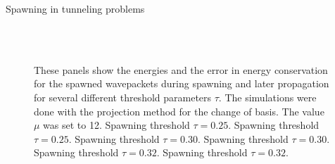 \begin{chapter}{Spawning in tunneling problems}
\begin{figure}[h!]
{  } \\
   \\
  \caption[Energies and energy drift of the spawned wavepackets during spawning and later propagation]{
  These panels show the energies and the error in energy conservation for the spawned wavepackets
  during spawning and later propagation for several different threshold parameters $\tau$.
  The simulations were done with the projection method for the change of basis. The value $\mu$ was set to 12.
   Spawning threshold $\tau = 0.25$.
   Spawning threshold $\tau = 0.25$.
   Spawning threshold $\tau = 0.30$.
   Spawning threshold $\tau = 0.30$.
   Spawning threshold $\tau = 0.32$.
   Spawning threshold $\tau = 0.32$.
  \label{fig:spawn_propag_project_K100_bs12_energies}
  }
\end{figure}



\end{chapter}
